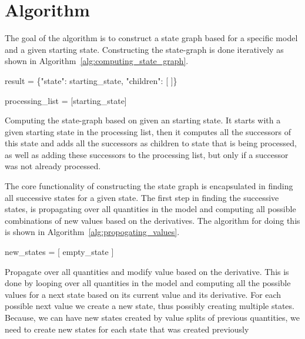 \documentclass[a4paper]{article}
\begin{document}
\section{Algorithm}
The goal of the algorithm is to construct a state graph based for a specific model and a given starting state. Constructing the state-graph is done iteratively as shown in Algorithm~\ref{alg:computing_state_graph}.
\begin{algorithm}
    result = \{"state": starting\_state, "children": [ ]\}

    processing\_list = [starting\_state]

\caption{Computing the state-graph based on given an starting state. It starts with a given starting state in the processing list, then it computes all the successors of this state and adds all the successors as children to state that is being processed, as well as adding these successors to the processing list, but only if a successor was not already processed.}
\label{alg:computing_state_graph}
\end{algorithm}

The core functionality of constructing the state graph is encapsulated in finding all successive states for a given state. The first step in finding the successive states, is propagating over all quantities in the model and computing all possible combinations of new values based on the derivatives. The algorithm for doing this is shown in Algorithm~\ref{alg:propogating_values}.
\begin{algorithm}
new\_states = [ empty\_state ]

\caption{Propagate over all quantities and modify value based on the derivative. This is done by looping over all quantities in the model and computing all the possible values for a next state based on its current value and its derivative. For each possible next value we create a new state, thus possibly creating multiple states. Because, we can have new states created by value splits of previous quantities, we need to create new states for each state that was created previously}
\label{alg:propogating_values}
\end{algorithm}
\end{document}
